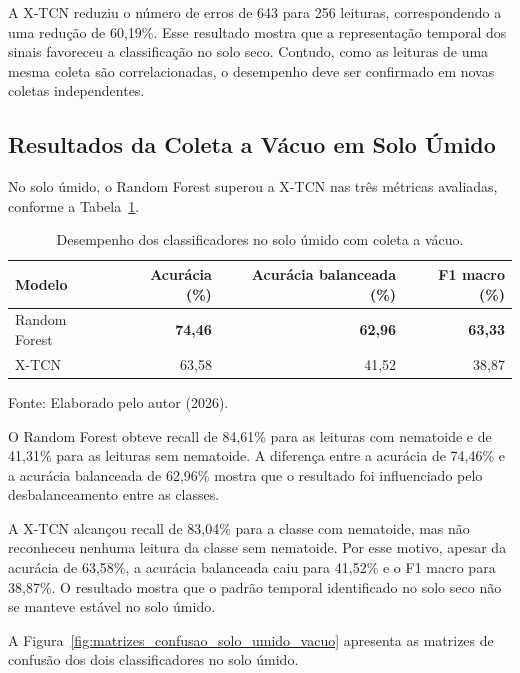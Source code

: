 A X-TCN reduziu o número de erros de 643 para 256 leituras, correspondendo a
uma redução de 60,19\%. Esse resultado mostra que a representação temporal dos
sinais favoreceu a classificação no solo seco. Contudo, como as leituras de
uma mesma coleta são correlacionadas, o desempenho deve ser confirmado em
novas coletas independentes.

\subsection{Resultados da Coleta a Vácuo em Solo Úmido}

No solo úmido, o Random Forest superou a X-TCN nas três métricas avaliadas,
conforme a Tabela~\ref{tab:resultados_solo_umido_vacuo}.

\begin{table}[htbp]
    \centering
    \caption{Desempenho dos classificadores no solo úmido com coleta a vácuo.}
    \label{tab:resultados_solo_umido_vacuo}
    \begin{tabular}{lrrr}
        \hline
        \textbf{Modelo} & \textbf{Acurácia (\%)} &
        \textbf{Acurácia balanceada (\%)} & \textbf{F1 macro (\%)} \\
        \hline
        Random Forest & \textbf{74,46} & \textbf{62,96} & \textbf{63,33} \\
        X-TCN         & 63,58          & 41,52          & 38,87          \\
        \hline
    \end{tabular}

    \vspace{0.1cm}
    {\footnotesize Fonte: Elaborado pelo autor (2026).}
\end{table}

O Random Forest obteve recall de 84,61\% para as leituras com nematoide e de
41,31\% para as leituras sem nematoide. A diferença entre a acurácia de 74,46\%
e a acurácia balanceada de 62,96\% mostra que o resultado foi influenciado pelo
desbalanceamento entre as classes.

A X-TCN alcançou recall de 83,04\% para a classe com nematoide, mas não
reconheceu nenhuma leitura da classe sem nematoide. Por esse motivo, apesar da
acurácia de 63,58\%, a acurácia balanceada caiu para 41,52\% e o F1 macro para
38,87\%. O resultado mostra que o padrão temporal identificado no solo seco
não se manteve estável no solo úmido.

A Figura~\ref{fig:matrizes_confusao_solo_umido_vacuo} apresenta as matrizes de
confusão dos dois classificadores no solo úmido.

